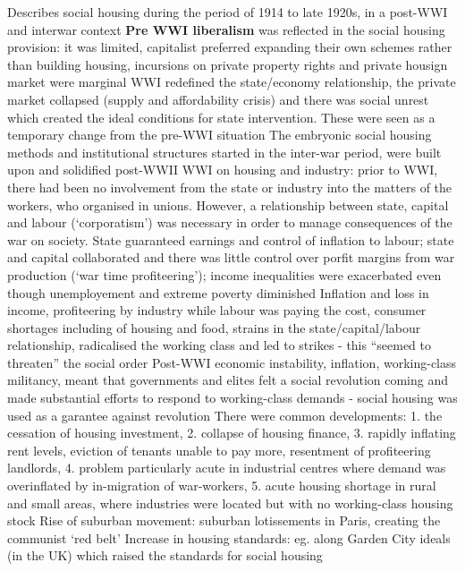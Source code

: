 \documentclass{article}
\begin{document}
\begin{outline}
	\1 Describes social housing during the period of 1914 to late 1920s, in a post-WWI and interwar context
	\1 \textbf{Pre WWI liberalism} was reflected in the social housing provision: it was limited, capitalist preferred expanding their own schemes rather than building housing, incursions on private property rights and private housign market were marginal
	\1 WWI redefined the state/economy relationship, the private market collapsed (supply and affordability crisis) and there was social unrest which created the ideal conditions for state intervention. These were seen as a temporary change from the pre-WWI situation
		\2 The embryonic social housing methods and institutional structures started in the inter-war period, were built upon and solidified post-WWII
	\1 WWI on housing and industry: prior to WWI, there had been no involvement from the state or industry into the matters of the workers, who organised in unions. However, a relationship between state, capital and labour (`corporatism') was necessary in order to manage consequences of the war on society. State guaranteed earnings and control of inflation to labour; state and capital collaborated and there was little control over porfit margins from war production (`war time profiteering'); income inequalities were exacerbated even though unemployement and extreme poverty diminished
		\2 Inflation and loss in income, profiteering by industry while labour was paying the cost, consumer shortages including of housing and food, strains in the state/capital/labour relationship, radicalised the working class and led to strikes - this ``seemed to threaten'' the social order
	\1 Post-WWI economic instability, inflation, working-class militancy, meant that governments and elites felt a social revolution coming and made substantial efforts to respond to working-class demands - social housing was used as a garantee against revolution
		\2 There were common developments: 1. the cessation of housing investment, 2. collapse of housing finance, 3. rapidly inflating rent levels, eviction of tenants unable to pay more, resentment of profiteering landlords, 4. problem particularly acute in industrial centres where demand was overinflated by in-migration of war-workers, 5. acute housing shortage in rural and small areas, where industries were located but with no working-class housing stock	
			\3 Rise of suburban movement: suburban lotissements in Paris, creating the communist `red belt'
			\3 Increase in housing standards: eg. along Garden City ideals (in the UK) which raised the standards for social housing

\end{outline}
\end{document}
